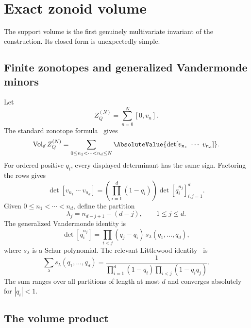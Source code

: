 \documentclass[11pt,a4paper]{article}
\theoremstyle{definition}
\theoremstyle{remark}
\newcommand{\Vol}{\operatorname{Vol}}
\begin{document}
\section{Exact zonoid volume}
\label{sec:volume}

The support volume is the first genuinely multivariate invariant of the construction.  Its closed form is unexpectedly simple.

\subsection{Finite zonotopes and generalized Vandermonde minors}

Let
\[
  Z_Q^{(N)}=\sum_{n=0}^{N}[0,v_n].
\]
The standard zonotope formula~\cite{Shephard,GoverKrikorian} gives
\begin{equation}
  \Vol_d Z_Q^{(N)}
   =\sum_{0\le n_1<\cdots<n_d\le N}
      \AbsoluteValue{\det[v_{n_1}\ \cdots\ v_{n_d}]}.
  \label{eq:finite-zono-volume}
\end{equation}
For ordered positive $q_i$, every displayed determinant has the same sign.  Factoring the rows gives
\begin{equation}
  \det[v_{n_1}\ \cdots\ v_{n_d}]
  =\left(\prod_{i=1}^d(1-q_i)\right)
    \det[q_i^{n_j}]_{i,j=1}^d.
  \label{eq:minor-factor}
\end{equation}
Given $0\le n_1<\cdots<n_d$, define the partition
\begin{equation}
  \lambda_j=n_{d-j+1}-(d-j),\qquad 1\le j\le d.
  \label{eq:lambda-map}
\end{equation}
The generalized Vandermonde identity is
\begin{equation}
  \det[q_i^{n_j}]
    =\prod_{i<j}(q_j-q_i)\,s_\lambda(q_1,\ldots,q_d),
  \label{eq:schur-minor}
\end{equation}
where $s_\lambda$ is a Schur polynomial.  The relevant Littlewood identity~\cite{Macdonald,StanleyEC2} is
\begin{equation}
  \sum_{\lambda}s_\lambda(q_1,\ldots,q_d)
   =\frac{1}{\displaystyle
      \prod_{i=1}^d(1-q_i)
      \prod_{i<j}(1-q_iq_j)}.
  \label{eq:littlewood}
\end{equation}
The sum ranges over all partitions of length at most $d$ and converges absolutely for $|q_i|<1$.

\subsection{The volume product}
\end{document}

